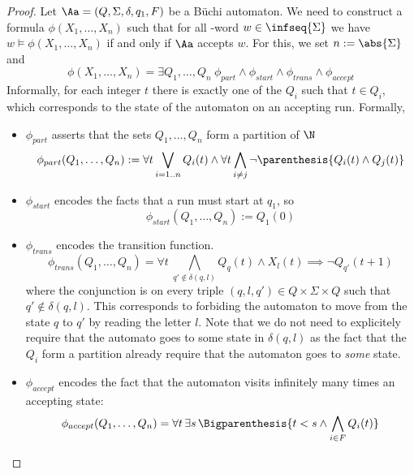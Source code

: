 \begin{proof}
    Let $\Aa = (Q, \Sigma, \delta, q_1, F)$ be a Büchi automaton.
    We need to construct a formula $\phi(X_1, \dots, X_n)$
    such that for all \w-word $w \in \infseq{\Sigma}$
    we have $w \models \phi(X_1, \dots, X_n)$
    if and only if $\Aa$ accepts $w$.
    For this, we set $n := \abs{\Sigma}$ and \[
        \phi(X_1, \dots, X_n) =
            \exists Q_1, \dots, Q_{n} ~
            \phi_{part}
            \wedge
            \phi_{start}
            \wedge
            \phi_{trans}
            \wedge
            \phi_{accept}
    \]
    Informally, for each integer $t$ there is exactly one
    of the $Q_i$ such that $t \in Q_i$, which corresponds
    to the state of the automaton on an accepting run.
    Formally,
    \begin{itemize}
        \item $\phi_{part}$ asserts that the sets $Q_1, \dots, Q_{n}$
            form a partition of $\N$
            \[\phi_{part}(Q_1, \dots, Q_n) :=
                \forall t \bigvee_{i=1..n} Q_i(t)
                \wedge
                \forall t \bigwedge_{i \neq j}
                    \neg \parenthesis{Q_i(t) \wedge Q_j(t)}
            \]
        \item $\phi_{start}$ encodes the facts that a run
            must start at $q_1$, so \[
                \phi_{start}(Q_1, \dots, Q_n) := Q_1(0)
            \]
        \item $\phi_{trans}$ encodes the transition function.
            \[
                \phi_{trans}(Q_1, \dots, Q_n) =
                \forall t~
                \bigwedge_{q' \notin \delta(q, l)}
                    Q_q(t) \wedge X_l(t) \implies \neg Q_{q'}(t + 1)
            \]
            where the conjunction is on every triple $(q, l, q') \in
                Q \times \Sigma \times Q$ such that $q' \notin \delta(q, l)$.
            This corresponds to forbiding the automaton to
            move from the state $q$ to $q'$ by reading the letter $l$.
            Note that we do not need to explicitely require that the
            automato goes to some state in $\delta(q, l)$ as
            the fact that the $Q_i$ form a partition already require
            that the automaton goes to \textit{some} state.
        \item $\phi_{accept}$ encodes the fact that the automaton
            visits infinitely many times an accepting state:
            \[
                \phi_{accept}(Q_1, \dots, Q_n) =
                \forall t\, \exists s\, \Bigparenthesis{
                    t < s \wedge \bigwedge_{i \in F} Q_i(t)
                }
            \]
    \end{itemize}


\end{proof}
